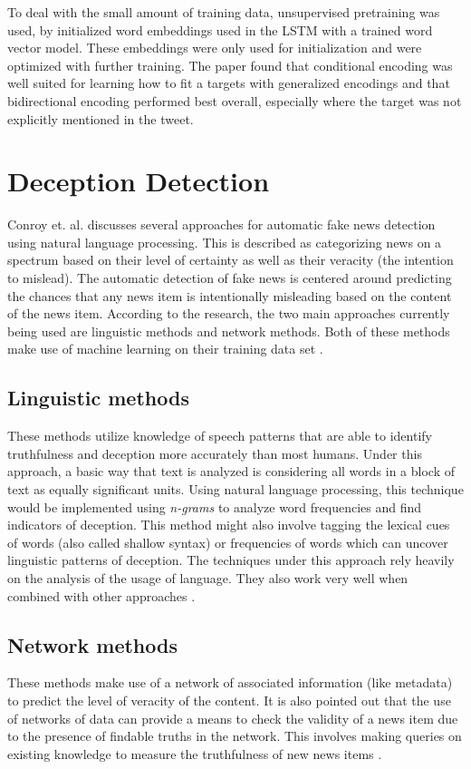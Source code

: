 \documentclass[11pt,a4paper]{article}
\begin{document}
To deal with the small amount of training data, unsupervised pretraining was used, by initialized word embeddings used in the LSTM with a trained word vector model. These embeddings were only used for initialization and were optimized with further training. The paper found that conditional encoding was well suited for learning how to fit a targets with generalized encodings and that bidirectional encoding performed best overall, especially where the target was not explicitly mentioned in the tweet. \\
\section{Deception Detection} 

Conroy et. al. discusses several approaches for automatic fake news detection using natural language processing. This is described as categorizing news on a spectrum based on their level of certainty as well as their veracity (the intention to mislead). The automatic detection of fake news is centered around predicting the chances that any news item is intentionally misleading based on the content of the news item. According to the research, the two main approaches currently being used are linguistic methods and network methods. Both of these methods make use of machine learning on their training data set \cite{conroy2015automatic}. \\

\subsection{Linguistic methods}
These methods utilize knowledge of speech patterns that are able to identify truthfulness and deception more accurately than most humans. Under this approach, a basic way that text is analyzed is considering all words in a block of text as equally significant units. Using natural language processing, this technique would be implemented using \textit{n-grams} to analyze word frequencies and find indicators of deception. This method might also involve tagging the lexical cues of words (also called shallow syntax) or frequencies of words which can uncover linguistic patterns of deception. The techniques under this approach rely heavily on the analysis of the usage of language. They also work very well when combined with other approaches \cite{conroy2015automatic}. 

\subsection{Network methods}
These methods make use of a network of associated information (like metadata) to predict the level of veracity of the content. It is also pointed out that the use of networks of data can provide a means to check the validity of a news item due to the presence of findable truths in the network. This involves making queries on existing knowledge to measure the truthfulness of new news items \cite{conroy2015automatic}. \\
\end{document}
